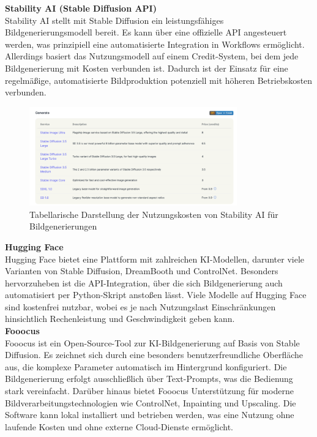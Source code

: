 \documentclass[a4paper,12pt]{article}
\begin{document}
\textbf{Stability AI (Stable Diffusion API)} \\
Stability AI stellt mit Stable Diffusion ein leistungsfähiges Bildgenerierungsmodell bereit. Es kann über eine offizielle API angesteuert werden, was prinzipiell eine automatisierte Integration in Workflows ermöglicht.
Allerdings basiert das Nutzungsmodell auf einem Credit-System, bei dem jede Bildgenerierung mit Kosten verbunden ist. Dadurch ist der Einsatz für eine regelmäßige, automatisierte Bildproduktion potenziell mit höheren Betriebskosten verbunden.

\begin{figure}[h]
    \centering
    \includegraphics[width=0.8\textwidth]{images/StabilityAI.png}
    \caption{Tabellarische Darstellung der Nutzungskosten von Stability AI für Bildgenerierungen}
    \label{fig:stabilityai}
\end{figure}


\textbf{Hugging Face} \\
Hugging Face bietet eine Plattform mit zahlreichen KI-Modellen, darunter viele Varianten von Stable Diffusion, DreamBooth und ControlNet. Besonders hervorzuheben ist die API-Integration, über die sich Bildgenerierung auch automatisiert per Python-Skript anstoßen lässt.
Viele Modelle auf Hugging Face sind kostenfrei nutzbar, wobei es je nach Nutzungslast Einschränkungen hinsichtlich Rechenleistung und Geschwindigkeit geben kann.
\\

\textbf{Fooocus} \\
Fooocus ist ein Open-Source-Tool zur KI-Bildgenerierung auf Basis von Stable Diffusion. Es zeichnet sich durch eine besonders benutzerfreundliche Oberfläche aus, die komplexe Parameter automatisch im Hintergrund konfiguriert. Die Bildgenerierung erfolgt ausschließlich über Text-Prompts, was die Bedienung stark vereinfacht.
Darüber hinaus bietet Fooocus Unterstützung für moderne Bildverarbeitungstechnologien wie ControlNet, Inpainting und Upscaling. Die Software kann lokal installiert und betrieben werden, was eine Nutzung ohne laufende Kosten und ohne externe Cloud-Dienste ermöglicht.
\end{document}
